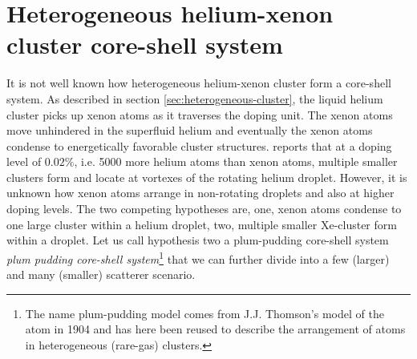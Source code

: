 \section{Heterogeneous helium-xenon cluster core-shell system}\label{sec:helium-data}
It is not well known how heterogeneous helium-xenon cluster form a core-shell system. As described in section \ref{sec:heterogeneous-cluster}, the liquid helium cluster picks up xenon atoms as it traverses the doping unit. The xenon atoms move unhindered in the superfluid helium and eventually the xenon atoms condense to energetically favorable cluster structures. \citep{Gomez-2014-Science} reports that at a doping level of $0.02\%$, i.e. 5000 more helium atoms than xenon atoms, multiple smaller clusters form and locate at vortexes of the rotating helium droplet. However, it is unknown how xenon atoms arrange in non-rotating droplets and also at higher doping levels. The two competing hypotheses are, one, xenon atoms condense to one large cluster within a helium droplet, two, multiple smaller Xe-cluster form within a droplet. Let us call hypothesis two a plum-pudding core-shell system \textit{plum pudding core-shell system}\footnote{The name plum-pudding model comes from J.J. Thomson's model of the atom in 1904 and has here been reused to describe the arrangement of atoms in heterogeneous (rare-gas) clusters.} that we can further divide into a few (larger) and many (smaller) scatterer scenario.\\
